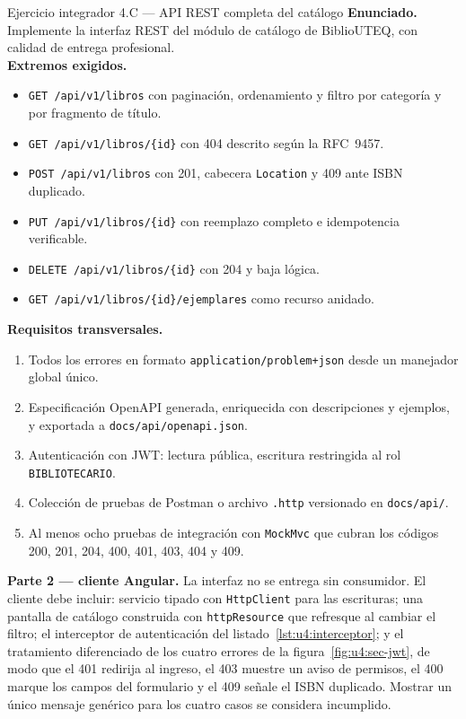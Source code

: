 \documentclass[11pt,a4paper,openany]{book}
\begin{document}
\begin{cajaejercicio}{Ejercicio integrador 4.C --- API REST completa del catálogo}
	\textbf{Enunciado.} Implemente la interfaz REST del módulo de catálogo de BiblioUTEQ, con calidad de entrega profesional.\\[4pt]
	\textbf{Extremos exigidos.}
	\begin{itemize}
		\item \texttt{GET /api/v1/libros} con paginación, ordenamiento y filtro por categoría y por fragmento de título.
		\item \texttt{GET /api/v1/libros/\{id\}} con 404 descrito según la RFC~9457.
		\item \texttt{POST /api/v1/libros} con 201, cabecera \texttt{Location} y 409 ante ISBN duplicado.
		\item \texttt{PUT /api/v1/libros/\{id\}} con reemplazo completo e idempotencia verificable.
		\item \texttt{DELETE /api/v1/libros/\{id\}} con 204 y baja lógica.
		\item \texttt{GET /api/v1/libros/\{id\}/ejemplares} como recurso anidado.
	\end{itemize}
	\textbf{Requisitos transversales.}
	\begin{enumerate}
		\item Todos los errores en formato \texttt{application/problem+json} desde un manejador global único.
		\item Especificación OpenAPI generada, enriquecida con descripciones y ejemplos, y exportada a \texttt{docs/api/openapi.json}.
		\item Autenticación con JWT: lectura pública, escritura restringida al rol \texttt{BIBLIOTECARIO}.
		\item Colección de pruebas de Postman o archivo \texttt{.http} versionado en \texttt{docs/api/}.
		\item Al menos ocho pruebas de integración con \texttt{MockMvc} que cubran los códigos 200, 201, 204, 400, 401, 403, 404 y 409.
	\end{enumerate}
	\textbf{Parte 2 --- cliente Angular.} La interfaz no se entrega sin consumidor. El cliente debe incluir: servicio tipado con \texttt{HttpClient} para las escrituras; una pantalla de catálogo construida con \texttt{httpResource} que refresque al cambiar el filtro; el interceptor de autenticación del listado~\ref{lst:u4:interceptor}; y el tratamiento diferenciado de los cuatro errores de la figura~\ref{fig:u4:sec-jwt}, de modo que el 401 redirija al ingreso, el 403 muestre un aviso de permisos, el 400 marque los campos del formulario y el 409 señale el ISBN duplicado. Mostrar un único mensaje genérico para los cuatro casos se considera incumplido.\\[4pt]

\end{cajaejercicio}
\end{document}
